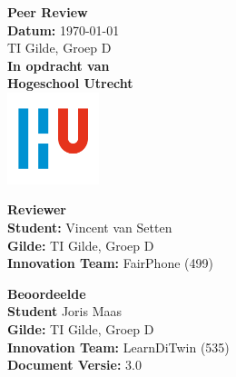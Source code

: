 \documentclass[a4paper]{article}
\begin{document}
\begin{titlepage}
  \begin{center}
      \vspace*{.9cm}
      \Huge
      \textbf{ Peer Review }\\
      \vspace{0.2cm}
      \small \textbf{Datum:} \today \\
      \small TI Gilde, Groep D \\

      \vspace{2cm}
      \normalsize
      \vspace{1cm}
      \Large
      \textbf{In opdracht van}\\
      \large
      \textbf{Hogeschool Utrecht} \\
      \includegraphics[width=0.2\textwidth]{Images/logouni.png}
      \vfill

      \begin{minipage}{0.45\textwidth}
        \large
        \textbf{Reviewer}\\
        \normalsize
        \textbf{Student:} Vincent van Setten \\
        \textbf{Gilde:} TI Gilde, Groep D\\
        \textbf{Innovation Team:} FairPhone (499) \\
        \vspace{2cm}
      \end{minipage}
      \hfill
      \begin{minipage}{0.45\textwidth}
        \large
        \textbf{Beoordeelde}\\
        \normalsize
        \textbf{Student} Joris Maas  \\
        \textbf{Gilde:} TI Gilde, Groep D\\
        \textbf{Innovation Team:} LearnDiTwin (535) \\
        \textbf{Document Versie:} 3.0 \\
        \vspace{2cm}
      \end{minipage}
    \end{center}
\end{titlepage}
\end{document}
